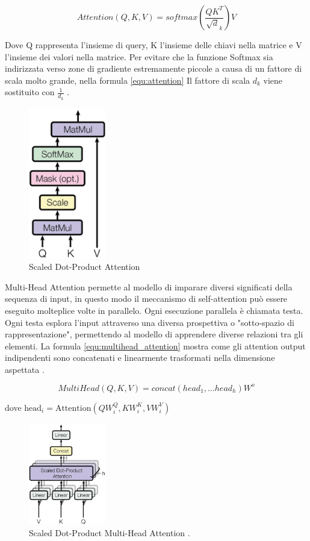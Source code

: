 \begin{equation*} Attention(Q, K, V) = softmax\left ({{\frac {QK^{T}}{\surd d_{k}}}}\right)V \tag {6} \label{equ:attention} \end{equation*}

Dove Q rappresenta l'insieme di query, K l'insieme delle chiavi nella matrice e V l'insieme dei valori nella matrice.
Per evitare che la funzione Softmax sia indirizzata verso zone di gradiente estremamente piccole a causa di un fattore di scala molto grande, nella formula \ref{equ:attention} Il fattore di scala \(d_k\) viene sostituito con \(\frac{1}{d_k}\) \cite{vaswani2017attention}.

\begin{figure}[ht]
	\centering
	\includegraphics[width=0.3\textwidth]{Immagini/self_attention_dot.png}
	\caption{Scaled Dot-Product Attention \cite{vaswani2017attention}}
	\label{fig:Scaled Dot-Product Attention}
\end{figure}

Multi-Head Attention permette al modello di imparare diversi significati della sequenza di input, in questo modo il meccanismo di self-attention può essere eseguito molteplice volte in parallelo.
Ogni esecuzione parallela è chiamata testa. Ogni testa esplora l'input attraverso una diversa prospettiva o "sotto-spazio di rappresentazione", permettendo al modello di apprendere diverse relazioni tra gli elementi.
La formula \ref{equ:multihead_attention} mostra come gli attention output indipendenti sono concatenati e linearmente trasformati nella dimensione aspettata \cite{vaswani2017attention}.

\begin{equation*} MultiHead\left ({{ Q, K, V }}\right)=concat\left ({{ {head}_{1},\ldots {head}_{h} }}\right)W^{o} \tag {7} \label{equ:multihead_attention} \end{equation*}

dove \(\text{head}_i = \text{Attention}(QW_i^Q, KW_i^K, VW_i^V)\)

\begin{figure}[ht]
	\centering
	\includegraphics[width=0.3\textwidth]{Immagini/Multi-Head.png}
	\caption{ Scaled Dot-Product Multi-Head Attention \cite{vaswani2017attention}.}
	\label{fig:Multi-Head}
\end{figure}